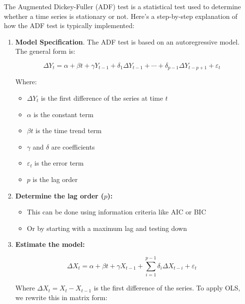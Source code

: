 \documentclass{article}
\begin{document}
  \begin{definition}
    \label{def:augmented-dicky-fuller-test}
    The Augmented Dickey-Fuller (ADF) test is a statistical test used to determine whether a time series is stationary or not. Here's a step-by-step explanation of how the ADF test is typically implemented:

    \begin{enumerate}
      \item \textbf{Model Specification}. The ADF test is based on an autoregressive model. The general form is:
      
      \begin{equation}
      \Delta Y_t = \alpha + \beta t + \gamma Y_{t-1} + \delta_1 \Delta Y_{t-1} + \cdots + \delta_{p-1} \Delta Y_{t-p+1} + \varepsilon_t
      \end{equation}
      
      Where:
      \begin{itemize}
          \item $\Delta Y_t$ is the first difference of the series at time $t$
          \item $\alpha$ is the constant term
          \item $\beta t$ is the time trend term
          \item $\gamma$ and $\delta$ are coefficients
          \item $\varepsilon_t$ is the error term
          \item $p$ is the lag order
      \end{itemize}

      \item \textbf{Determine the lag order ($p$):}
      \begin{itemize}
          \item This can be done using information criteria like AIC or BIC
          \item Or by starting with a maximum lag and testing down
      \end{itemize}

      \item \textbf{Estimate the model:}

      \begin{equation}
      \Delta X_t = \alpha + \beta t + \gamma X_{t-1} + \sum_{i=1}^{p-1} \delta_i \Delta X_{t-i} + \varepsilon_t
      \end{equation}

      Where $\Delta X_t = X_t - X_{t-1}$ is the first difference of the series. To apply OLS, we rewrite this in matrix form:


\end{enumerate}
\end{definition}
\end{document}
